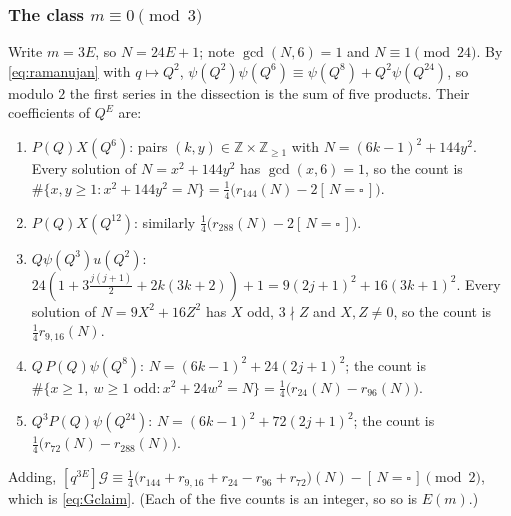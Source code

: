 \documentclass[11pt]{amsart}
\theoremstyle{definition}
\theoremstyle{remark}
\numberwithin{equation}{section}
\newcommand{\Z}{\mathbb{Z}}
\newcommand{\sq}{\square}
\newcommand{\ind}[1]{[\,#1\,]}
\begin{document}
\subsubsection*{The class $m\equiv0\pmod 3$}
Write $m=3E$, so $N=24E+1$; note $\gcd(N,6)=1$ and $N\equiv1\pmod{24}$. By \eqref{eq:ramanujan} with $q\mapsto Q^2$, $\psi(Q^2)\psi(Q^6)\equiv\psi(Q^8)+Q^2\psi(Q^{24})$, so modulo $2$ the first series in the dissection is the sum of five products. Their coefficients of $Q^E$ are:
\begin{enumerate}[label=\textup{(\arabic*)}]
\item $P(Q)X(Q^6)$: pairs $(k,y)\in\Z\times\Z_{\ge1}$ with $N=(6k-1)^2+144y^2$. Every solution of $N=x^2+144y^2$ has $\gcd(x,6)=1$, so the count is $\#\{x,y\ge1: x^2+144y^2=N\}=\frac14\big(r_{144}(N)-2\ind{N=\sq}\big)$.
\item $P(Q)X(Q^{12})$: similarly $\frac14\big(r_{288}(N)-2\ind{N=\sq}\big)$.
\item $Q\psi(Q^3)u(Q^2)$: $24(1+3\tfrac{j(j+1)}2+2k(3k+2))+1=9(2j+1)^2+16(3k+1)^2$. Every solution of $N=9X^2+16Z^2$ has $X$ odd, $3\nmid Z$ and $X,Z\neq0$, so the count is $\frac14 r_{9,16}(N)$.
\item $Q\,P(Q)\psi(Q^8)$: $N=(6k-1)^2+24(2j+1)^2$; the count is $\#\{x\ge1,\ w\ge1\text{ odd}: x^2+24w^2=N\}=\frac14\big(r_{24}(N)-r_{96}(N)\big)$.
\item $Q^3P(Q)\psi(Q^{24})$: $N=(6k-1)^2+72(2j+1)^2$; the count is $\frac14\big(r_{72}(N)-r_{288}(N)\big)$.
\end{enumerate}
Adding, $[q^{3E}]\mathcal G\equiv\frac14\big(r_{144}+r_{9,16}+r_{24}-r_{96}+r_{72}\big)(N)-\ind{N=\sq}\pmod 2$, which is \eqref{eq:Gclaim}. (Each of the five counts is an integer, so so is $E(m)$.)
\end{document}
